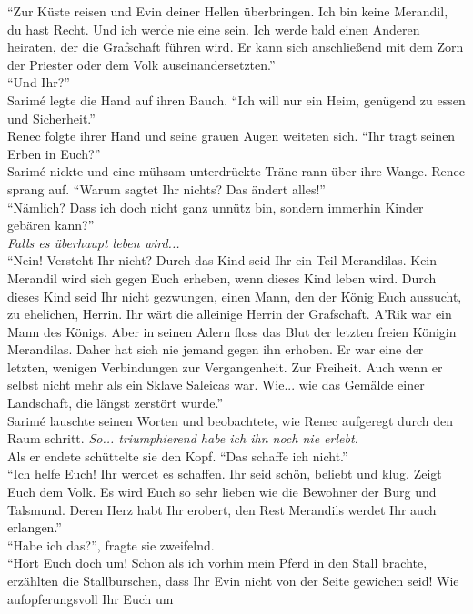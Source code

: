 ``Zur Küste reisen und Evin deiner Hellen überbringen. Ich bin keine Merandil, du hast Recht. Und 
ich 
werde nie eine sein. Ich werde bald einen Anderen heiraten, der die Grafschaft führen wird. Er kann 
sich anschließend mit dem Zorn der Priester oder dem Volk auseinandersetzten.''\\
``Und Ihr?''\\
Sarimé legte die Hand auf ihren Bauch. ``Ich will nur ein Heim, genügend zu essen und 
Sicherheit.''\\
Renec folgte ihrer Hand und seine grauen Augen weiteten sich. ``Ihr tragt seinen Erben in Euch?''\\
Sarimé nickte und eine mühsam unterdrückte Träne rann über ihre Wange. Renec sprang auf. ``Warum 
sagtet Ihr nichts? Das ändert alles!''\\
``Nämlich? Dass ich doch nicht ganz unnütz bin, sondern immerhin Kinder gebären kann?''\\
\textit{Falls es überhaupt leben wird...}\\
``Nein! Versteht Ihr nicht? Durch das Kind seid Ihr ein Teil Merandilas. Kein Merandil wird sich 
gegen Euch erheben, wenn dieses Kind leben wird. Durch dieses Kind seid Ihr nicht gezwungen, einen 
Mann, den der König Euch aussucht, zu ehelichen, Herrin. Ihr wärt die alleinige Herrin der 
Grafschaft. A'Rik war ein Mann des Königs. Aber in seinen Adern floss das Blut der letzten freien 
Königin Merandilas. Daher hat sich nie jemand gegen ihn erhoben. Er war eine der letzten, wenigen 
Verbindungen zur Vergangenheit. Zur Freiheit. Auch wenn er selbst nicht mehr als ein Sklave 
Saleicas war. Wie... wie das Gemälde einer Landschaft, die längst zerstört wurde.''\\
Sarimé lauschte seinen Worten und beobachtete, wie Renec aufgeregt durch den Raum schritt. 
\textit{So... triumphierend habe ich ihn noch nie erlebt.}\\
Als er endete schüttelte sie den Kopf. ``Das schaffe ich nicht.''\\
``Ich helfe Euch! Ihr werdet es schaffen. Ihr seid schön, beliebt und klug. Zeigt Euch dem Volk. Es 
wird Euch so sehr lieben wie die Bewohner der Burg und Talsmund. Deren Herz habt Ihr erobert, den 
Rest Merandils werdet Ihr auch erlangen.''\\
``Habe ich das?'', fragte sie zweifelnd.\\
``Hört Euch doch um! Schon als ich vorhin mein Pferd in den Stall brachte, erzählten die 
Stallburschen, dass Ihr Evin nicht von der Seite gewichen seid! Wie aufopferungsvoll Ihr Euch um 
